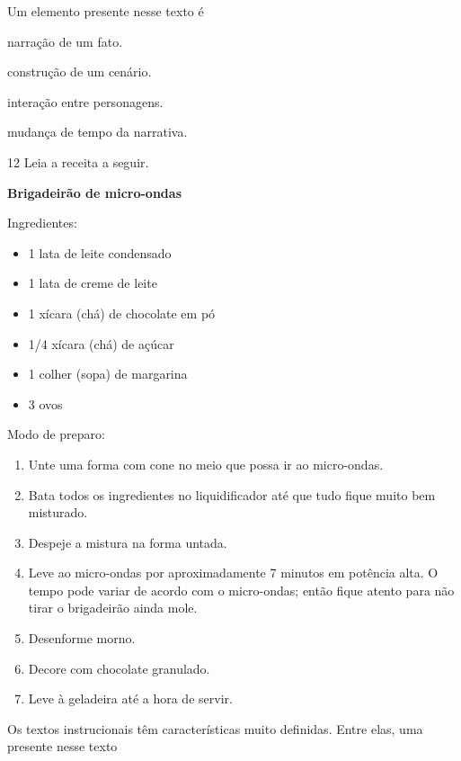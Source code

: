 Um elemento presente nesse texto é

\begin{escolha}
\item narração de um fato.

\item construção de um cenário.

\item interação entre personagens.

\item mudança de tempo da narrativa.
\end{escolha}



\num{12} Leia a receita a seguir.

\textbf{Brigadeirão de micro-ondas}

Ingredientes:

\begin{itemize}
\item
  1 lata de leite condensado
\item
  1 lata de creme de leite
\item
  1 xícara (chá) de chocolate em pó
\item
  1/4 xícara (chá) de açúcar
\item
  1 colher (sopa) de margarina
\item
  3 ovos
\end{itemize}

Modo de preparo:

\begin{enumerate}
\item
  Unte uma forma com cone no meio que possa ir ao micro-ondas.
\item
  Bata todos os ingredientes no liquidificador até que tudo fique muito
  bem misturado.
\item
  Despeje a mistura na forma untada.
\item
  Leve ao micro-ondas por aproximadamente 7 minutos em potência alta. O
  tempo pode variar de acordo com o micro-ondas; então fique atento para
  não tirar o brigadeirão ainda mole.
\item
  Desenforme morno.
\item
  Decore com chocolate granulado.
\item
  Leve à geladeira até a hora de servir.
\end{enumerate}


Os textos instrucionais têm características muito definidas. Entre elas,
uma presente nesse texto

